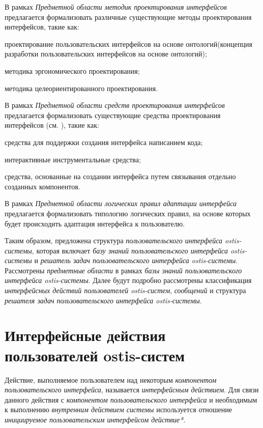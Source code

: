 \bigskip

В рамках \textit{Предметной области методик проектирования интерфейсов} предлагается формализовать различные существующие методы проектирования интерфейсов, такие как:
\begin{textitemize}
	\item проектирование пользовательских интерфейсов на основе онтологий(концепция разработки пользовательских интерфейсов на основе онтологий);
	\item методика эргономического проектирования;
	\item методика целеориентированного проектирования.
\end{textitemize}

В рамках \textit{Предметной области средств проектирования интерфейсов} предлагается формализовать существующие средства проектирования интерфейсов (см. ), такие как:
\begin{textitemize}
	\item средства для поддержки создания интерфейса написанием кода;
	\item интерактивные инструментальные средства;
	\item средства, основанные на создании интерфейса путем связывания отдельно созданных компонентов.
\end{textitemize}

В рамках \textit{Предметной области логических правил адаптации интерфейса} предлагается формализовать типологию логических правил, на основе которых будет происходить адаптация интерфейса к пользователю.

Таким образом, предложена структура \textit{пользовательского интерфейса ostis-системы}, которая включает \textit{базу знаний пользовательского интерфейса ostis-системы} и \textit{решатель задач пользовательского интерфейса ostis-системы}. Рассмотрены \textit{предметные области} в рамках \textit{базы знаний пользовательского интерфейса ostis-системы}. Далее будут подробно рассмотрены классификация \textit{интерфейсных действий пользователей ostis-систем}, \textit{сообщений} и структура \textit{решателя задач пользовательского интерфейса ostis-системы}.

\section{Интерфейсные действия пользователей ostis-систем}
\label{sec_interface_user_actions}


Действие, выполняемое пользователем над некоторым \textit{компонентом пользовательского интерфейса}, называется \textit{интерфейсным действием}. Для связи данного действия с \textit{компонентом пользовательского интерфейса} и необходимым к выполнению \textit{внутренним действием системы} используется отношение \textit{инициируемое пользовательским интерфейсом действие*}.


